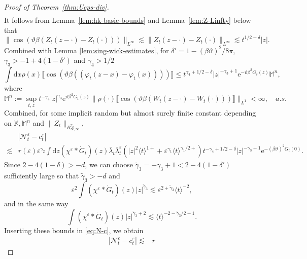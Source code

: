 \documentclass[11pt, a4paper]{scrartcl}
\numberwithin{equation}{section}
\theoremstyle{plain}
\theoremstyle{remark}
\newcommand{\assign}{:=}
\newcommand{\mathd}{\mathrm{d}}
\newcommand{\mathe}{\mathrm{e}}
\begin{document}
\begin{proof}[Proof of Theorem~\ref{thm:Ueps-div}]
\begin{equation*}
\begin{aligned}
    \end{aligned}
  \end{equation*}
  It follows from Lemma~\ref{lem:hk-basic-bounds} and Lemma~\ref{lem:Z-Linfty}
  below that
  \[ \| \cos (\vartheta \beta (Z_t (z - \cdot) - Z_t (\cdot)) )
     \|_{L^{\infty}} \lesssim \| Z_t (z - \cdot) - Z_t (\cdot) \|_{L^{\infty}}
     \lesssim t^{1 / 2 - \delta} | z | . \]
  Combined with Lemma \ref{lem:sing-wick-estimates}, for $\delta' = 1 - (\beta
  \vartheta)^2 / 8 \pi$, $\gamma_3 > - 1 + 4 (1 - \delta')$ and $\gamma_4 > 1
  / 2$
  \[ \int \mathd x \rho (x) \llbracket \cos (\vartheta \beta ((\varphi_t (z -
     x) - \varphi_t (x)))) \rrbracket \leqslant t^{\gamma_4 + 1 / 2 - \delta}
     | z |^{- \gamma_3 + 1} \mathe^{- \vartheta \beta^2 G_t (z)} \mathbb{M}^n,
  \]
  where
  \[ \mathbb{M}^n \assign \sup_{t, z} t^{- \gamma_4} | z |^{\gamma_3}
     \mathe^{\vartheta \beta^2 G_t (z)} \| \rho (\cdot) \llbracket \cos
     (\vartheta \beta (W_t (z - \cdot) - W_t (\cdot))) \rrbracket \|_{L^1}  <
     \infty, \quad a.s. \]
  Combined, for some implicit random but almost surely finite constant
  depending on $\mathbb{X}, \mathbb{M}^n$ and $\| Z_t
  \|_{B^{\gamma_2}_{\infty, \infty}}$,
  \begin{equation}
    \begin{aligned}
      & | \mathcal{N}^{\varepsilon}_t - c_t^{\varepsilon} |\\
      \lesssim & r (\varepsilon) \varepsilon^{\gamma_2} \int \mathd z
      (\chi^{\varepsilon} \ast \dot{G}_t ) (z) \bar{\lambda}_t
      \bar{\lambda}_t^{\varepsilon} (| z |^2 \langle t \rangle^{1 +} +
      \varepsilon^{\gamma_1} \langle t \rangle^{\gamma_1 / 2 +}) t^{- \gamma_4
      + 1 / 2 - \delta} | z |^{- \gamma_3 + 1} \mathe^{- (\beta \vartheta)^2
      G_t (0)} .
    \end{aligned}  \label{eq:N-c}
  \end{equation}
  Since $2 - 4 (1 - \delta) > - d$, we can choose $\tilde{\gamma}_3 = -
  \gamma_3 + 1 < 2 - 4 (1 - \delta')$ sufficiently large so that
  $\tilde{\gamma}_3 > - d$ and
  \[ \varepsilon^2 \int (\chi^{\varepsilon} \ast \dot{G}_t ) (z) | z
     |^{\tilde{\gamma}_3} \lesssim \varepsilon^{2 + \tilde{\gamma}_3} \langle
     t \rangle^{- 2}, \]
  and in the same way
  \[ \int (\chi^{\varepsilon} \ast \dot{G}_t ) (z) | z |^{\tilde{\gamma}_3 +
     2} \lesssim \langle t \rangle^{- 2 - \tilde{\gamma}_3 / 2 - 1} . \]
  Inserting these bounds in \eqref{eq:N-c}, we obtain
  \[ \begin{aligned}
       | \mathcal{N}^{\varepsilon}_t - c_t^{\varepsilon} | \lesssim & r

\end{aligned}\]
\end{proof}
\end{document}
